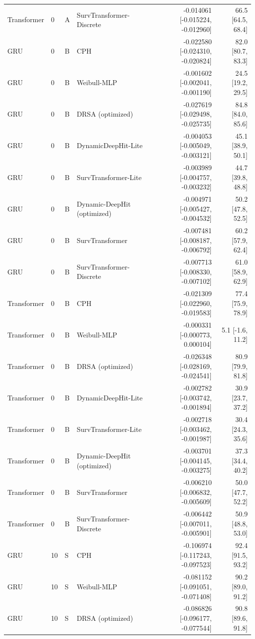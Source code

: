 \begin{longtable}{lll p{3.0cm} rr}
Transformer & 0 & A & SurvTransformer-Discrete & -0.014061 [-0.015224, -0.012960] & 66.5 [64.5, 68.4]\\
GRU & 0 & B & CPH & -0.022580 [-0.024310, -0.020824] & 82.0 [80.7, 83.3]\\
GRU & 0 & B & Weibull-MLP & -0.001602 [-0.002041, -0.001190] & 24.5 [19.2, 29.5]\\
GRU & 0 & B & DRSA (optimized) & -0.027619 [-0.029498, -0.025735] & 84.8 [84.0, 85.6]\\
GRU & 0 & B & DynamicDeepHit-Lite & -0.004053 [-0.005049, -0.003121] & 45.1 [38.9, 50.1]\\
GRU & 0 & B & SurvTransformer-Lite & -0.003989 [-0.004757, -0.003232] & 44.7 [39.8, 48.8]\\
GRU & 0 & B & Dynamic-DeepHit (optimized) & -0.004971 [-0.005427, -0.004532] & 50.2 [47.8, 52.5]\\
GRU & 0 & B & SurvTransformer & -0.007481 [-0.008187, -0.006792] & 60.2 [57.9, 62.4]\\
GRU & 0 & B & SurvTransformer-Discrete & -0.007713 [-0.008330, -0.007102] & 61.0 [58.9, 62.9]\\
Transformer & 0 & B & CPH & -0.021309 [-0.022960, -0.019583] & 77.4 [75.9, 78.9]\\
Transformer & 0 & B & Weibull-MLP & -0.000331 [-0.000773, 0.000104] & 5.1 [-1.6, 11.2]\\
Transformer & 0 & B & DRSA (optimized) & -0.026348 [-0.028169, -0.024541] & 80.9 [79.9, 81.8]\\
Transformer & 0 & B & DynamicDeepHit-Lite & -0.002782 [-0.003742, -0.001894] & 30.9 [23.7, 37.2]\\
Transformer & 0 & B & SurvTransformer-Lite & -0.002718 [-0.003462, -0.001987] & 30.4 [24.3, 35.6]\\
Transformer & 0 & B & Dynamic-DeepHit (optimized) & -0.003701 [-0.004145, -0.003275] & 37.3 [34.4, 40.2]\\
Transformer & 0 & B & SurvTransformer & -0.006210 [-0.006832, -0.005609] & 50.0 [47.7, 52.2]\\
Transformer & 0 & B & SurvTransformer-Discrete & -0.006442 [-0.007011, -0.005901] & 50.9 [48.8, 53.0]\\
GRU & 10 & S & CPH & -0.106974 [-0.117243, -0.097523] & 92.4 [91.5, 93.2]\\
GRU & 10 & S & Weibull-MLP & -0.081152 [-0.091051, -0.071408] & 90.2 [89.0, 91.2]\\
GRU & 10 & S & DRSA (optimized) & -0.086826 [-0.096177, -0.077544] & 90.8 [89.6, 91.8]\\

\end{longtable}
